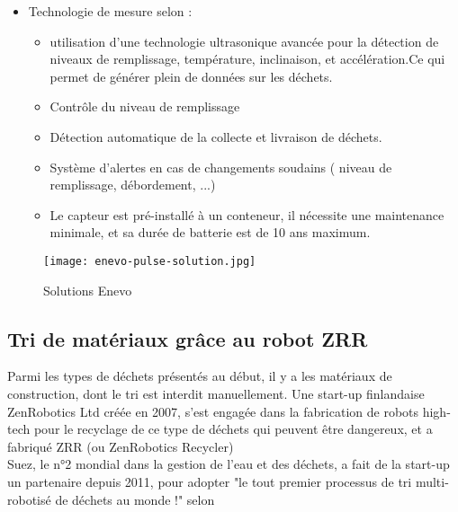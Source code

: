 \documentclass[a4paper,12pt]{report}
\begin{document}
\begin{itemize}
\begin{itemize}
\end{itemize}
\item Technologie de mesure selon :
\begin{itemize}
\item utilisation d'une technologie ultrasonique avancée pour la détection de niveaux de remplissage, température, inclinaison, et accélération.Ce qui permet de générer plein de données sur les déchets.
\item Contrôle du niveau de remplissage
\item Détection automatique de la collecte et livraison de déchets.
\item Système d'alertes en cas de changements soudains ( niveau de remplissage, débordement, ...)
\item Le capteur est pré-installé à un conteneur, il nécessite une maintenance minimale, et sa durée de batterie est de 10 ans maximum.
\end{itemize}
\end{itemize}
\begin {figure}[H]
\begin{center} \texttt{[image: enevo-pulse-solution.jpg]}
\label{tab}
\caption{Solutions Enevo \cite{ref9}}

\end{center}
\end{figure}
\subsection{Tri de matériaux grâce au robot ZRR}
Parmi les types de déchets présentés au début, il y a les matériaux de construction, dont le tri est interdit manuellement. Une start-up finlandaise ZenRobotics Ltd créée en 2007, s'est engagée dans la fabrication de robots high-tech pour le recyclage de ce type de déchets qui peuvent être dangereux, et a fabriqué ZRR (ou ZenRobotics Recycler)\\
Suez, le n°2 mondial dans la gestion de l'eau et des déchets, a fait de la start-up un partenaire depuis 2011, pour adopter "le tout premier processus de tri multi-robotisé de déchets au monde !" selon \cite{ref12}\\
\end{document}
